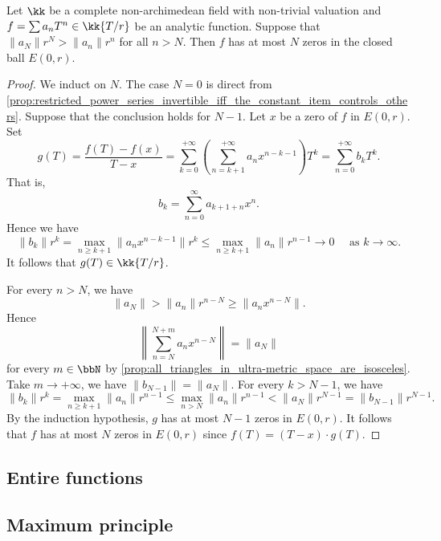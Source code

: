     \begin{theorem}[Strassman]\label{prop:Strassman_theorem}
        Let \(\kk\) be a complete non-archimedean field with non-trivial valuation and \(f = \sum a_n T^n \in \kk\{T/r\}\) be an analytic function.
        Suppose that \(\|a_N\|r^N > \|a_n\|r^n\) for all \(n > N\).
        Then \(f\) has at most \(N\) zeros in the closed ball \(E(0,r)\).
    \end{theorem}
    \begin{proof}
        We induct on \(N\).
        The case \(N = 0\) is direct from \cref{prop:restricted_power_series_invertible_iff_the_constant_item_controls_others}.
        Suppose that the conclusion holds for \(N-1\).
        Let \(x\) be a zero of \(f\) in \(E(0,r)\).
        Set 
        \[ g(T) = \frac{f(T) - f(x)}{T - x} = \sum_{k=0}^{+\infty} \left( \sum_{n=k+1}^{+\infty} a_n x^{n-k-1} \right) T^{k} = \sum_{n=0}^{+\infty} b_k T^k. \]
        That is,
        \[ b_k = \sum_{n=0}^\infty a_{k+1+n} x^n. \]
        Hence we have 
        \[ \|b_k\|r^k = \max_{n\geq k+1} \|a_{n} x^{n-k-1}\|r^k \leq \max_{n \geq k+1}\|a_{n}\| r^{n-1} \to 0 \quad \text{ as } k \to \infty. \]
        It follows that \(g(T) \in \kk\{T/r\}\).

        For every \(n > N\), we have 
        \[ \|a_N\| > \|a_{n}\|r^{n-N} \geq \|a_n x^{n-N}\|. \]
        Hence 
        \[ \left\|\sum_{n=N}^{N+m} a_n x^{n-N}\right\| = \|a_N\| \]
        for every \(m \in \bbN\) by \cref{prop:all_triangles_in_ultra-metric_space_are_isosceles}.
        Take \(m \to +\infty\), we have \(\|b_{N-1}\| = \|a_N\|\).
        For every \(k > N - 1\), we have
        \[ \|b_k\|r^k = \max_{n \geq k+1} \|a_n\| r^{n-1} \leq \max_{n > N} \|a_n\| r^{n-1} < \|a_N\| r^{N-1} = \|b_{N-1}\| r^{N-1}. \]
        By the induction hypothesis, \(g\) has at most \(N-1\) zeros in \(E(0,r)\).
        It follows that \(f\) has at most \(N\) zeros in \(E(0,r)\) since \(f(T) = (T - x) \cdot g(T)\).
    \end{proof}




\subsection{Entire functions}


\subsection{Maximum principle}
